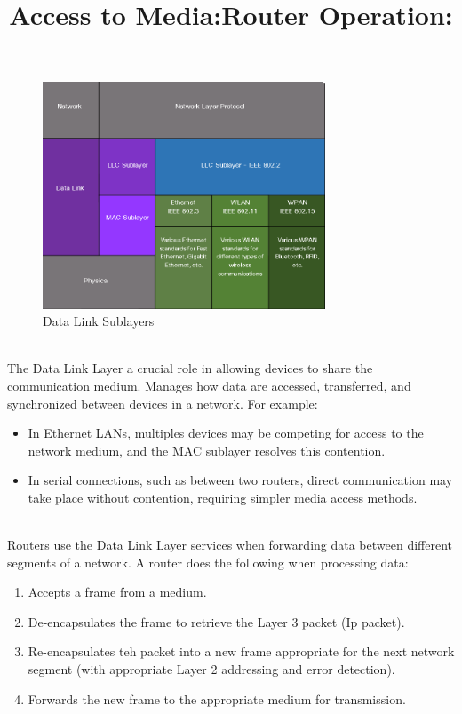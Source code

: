 \documentclass[a4paper,11pt]{article}
\begin{document}
\begin{figure}[h!]
    \centering
    \includegraphics[width=0.75\textwidth]{17.png}
    \caption{Data Link Sublayers}
    \label{fig:cap1}
\end{figure}

\title{Access to Media:}\\
The Data Link Layer a crucial role in allowing devices to share the communication medium. Manages how data are accessed, transferred, and synchronized between devices in a network. For example:\\

\begin{itemize}
    \item In Ethernet LANs, multiples devices may be competing for access to the network medium, and the MAC sublayer resolves this contention.\\
    \item In serial connections, such as between two routers, direct communication may take place without contention, requiring simpler media access methods.\\
\end{itemize}

\title{Router Operation:}\\
Routers use the Data Link Layer services when forwarding data between different segments of a network. A router does the following when processing data:\\

\begin{enumerate}
    \item Accepts a frame from a medium.\\
    \item De-encapsulates the frame to retrieve the Layer 3 packet (Ip packet).\\
    \item Re-encapsulates teh packet into a new frame appropriate for the next network segment (with appropriate Layer 2 addressing and error detection).\\
    \item Forwards the new frame to the appropriate medium for transmission.
\end{enumerate}
\end{document}
